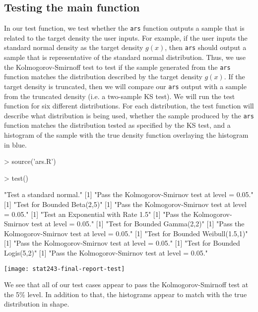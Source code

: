 \documentclass[12pt]{article}
\begin{document}
\subsection*{Testing the main function}
In our test function, we test whether the \texttt{ars} function outputs a sample that is related to the target density the user inputs.  For example, if the user inputs the standard normal density as the target density $g(x)$, then \texttt{ars} should output a sample that is representative of the standard normal distribution.  Thus, we use the Kolmogorov-Smirnoff test to test if the sample generated from the \texttt{ars} function matches the distribution described by the target density $g(x)$.  If the target density is truncated, then we will compare our \texttt{ars} output with a sample from the truncated density (i.e. a two-sample KS test).  We will run the test function for six different distributions.  For each distribution, the test function will describe what distribution is being used, whether the sample produced by the \texttt{ars} function matches the distribution tested as specified by the KS test, and a histogram of the sample with the true density function overlaying the histogram in blue.  
\begin{Schunk}
\begin{Sinput}
> source('ars.R')
\end{Sinput}
\end{Schunk}

\begin{Schunk}
\begin{Sinput}
> test()
\end{Sinput}
\begin{Soutput}
[1] "Test a standard normal."
[1] "Pass the Kolmogorov-Smirnov test at level = 0.05."
[1] "Test for Bounded Beta(2,5)"
[1] "Pass the Kolmogorov-Smirnov test at level = 0.05."
[1] "Test an Exponential with Rate 1.5"
[1] "Pass the Kolmogorov-Smirnov test at level = 0.05."
[1] "Test for Bounded Gamma(2,2)"
[1] "Pass the Kolmogorov-Smirnov test at level = 0.05."
[1] "Test for Bounded Weibull(1.5,1)"
[1] "Pass the Kolmogorov-Smirnov test at level = 0.05."
[1] "Test for Bounded Logis(5,2)"
[1] "Pass the Kolmogorov-Smirnov test at level = 0.05."
\end{Soutput}
\end{Schunk}
\texttt{[image: stat243-final-report-test]}

We see that all of our test cases appear to pass the Kolmogorov-Smirnoff test at the 5\% level.  In addition to that, the histograms appear to match with the true distribution in shape.
\end{document}
